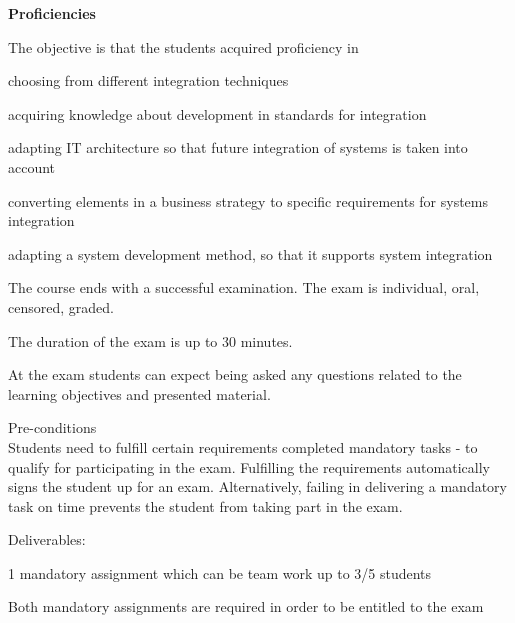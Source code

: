 \documentclass[Screen16to9,17pt]{foils}
\begin{document}

{\bf Proficiencies}

The objective is that the students acquired proficiency in

\begin{list2}
\item choosing from different integration techniques
\item acquiring knowledge about development in standards for integration
\item adapting IT architecture so that future integration of systems is taken into account
\item converting elements in a business strategy to specific requirements for systems integration
\item adapting a system development method, so that it supports system integration
\end{list2}



\begin{list2}
\item The course ends with a successful examination. The exam is individual, oral, censored, graded.
\item The duration of the exam is up to 30 minutes.
\item At the exam students can expect being asked any questions related to the learning objectives and presented material.
\end{list2}

Pre-conditions\\
Students need to fulfill certain requirements  completed mandatory tasks - to qualify for participating in the exam.
Fulfilling the requirements automatically signs the student up for an exam. Alternatively, failing in delivering a mandatory
task on time prevents the student from taking part in the exam.

\begin{list2}
\item Deliverables:
\item 1 mandatory assignment which can be team work up to 3/5 students
\item Both mandatory assignments are required in order to be entitled to the exam
\end{list2}



\end{document}
